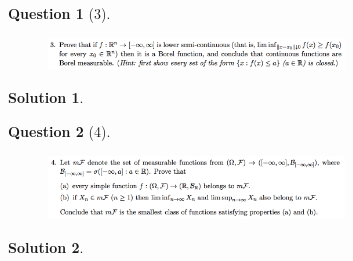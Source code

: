 \documentclass{article} %
\theoremstyle{quest}
\newtheorem*{question}{Question}
\newtheorem*{solution}{Solution}
\begin{document}
\newpage

\begin{question}[3]
\hfill
\begin{figure}[h!]
  \centering
    \includegraphics[width=0.7\textwidth]{problim-e1-p3.png}
\end{figure}
\end{question}
\begin{solution} \hfill \\

\end{solution}

\newpage 

\begin{question}[4]
\hfill
\begin{figure}[h!]
  \centering
    \includegraphics[width=0.7\textwidth]{problim-e1-p4.png}
\end{figure}
\end{question}
\begin{solution} \hfill \\

\end{solution}
\newpage
\end{document}
